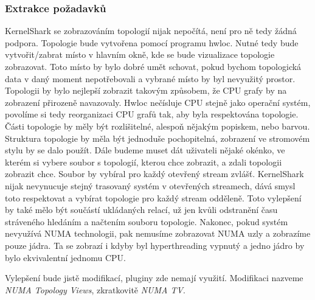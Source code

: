 \subsubsection*{Extrakce požadavků}
KernelShark se zobrazováním topologií nijak nepočítá, není pro ně tedy žádná podpora. Topologie bude vytvořena pomocí programu hwloc. Nutné tedy bude vytvořit/zabrat místo v hlavním okně, kde se bude vizualizace topologie zobrazovat. Toto místo by bylo dobré umět schovat, pokud bychom topologická data v daný moment nepotřebovali a vybrané místo by byl nevyužitý prostor. Topologii by bylo nejlepší zobrazit takovým způsobem, že CPU grafy by na zobrazení přirozeně navazovaly. Hwloc nečísluje CPU stejně jako operační systém, povolíme si tedy reorganizaci CPU grafů tak, aby byla respektována topologie. Části topologie by měly být rozlišitelné, alespoň nějakým popiskem, nebo barvou. Struktura topologie by měla být jednoduše pochopitelná, zobrazení ve stromovém stylu by se dalo použít. Dále budeme muset dát uživateli nějaké okénko, ve kterém si vybere soubor s topologií, kterou chce zobrazit, a zdali topologii zobrazit chce. Soubor by vybíral pro každý otevřený stream zvlášť. KernelShark nijak nevynucuje stejný trasovaný systém v otevřených streamech, dává smysl toto respektovat a vybírat topologie pro každý stream odděleně. Toto vylepšení by také mělo být součástí ukládaných relací, už jen kvůli odstranění času stráveného hledáním a načtením souboru topologie. Nakonec, pokud systém nevyužívá NUMA technologii, pak nemusíme zobrazovat NUMA uzly a zobrazíme pouze jádra. Ta se zobrazí i kdyby byl hyperthreading vypnutý a jedno jádro by bylo ekvivalentní jednomu CPU.

Vylepšení bude jistě modifikací, pluginy zde nemají využití. Modifikaci nazveme \emph{NUMA Topology Views}, zkratkovitě \emph{NUMA TV}.

